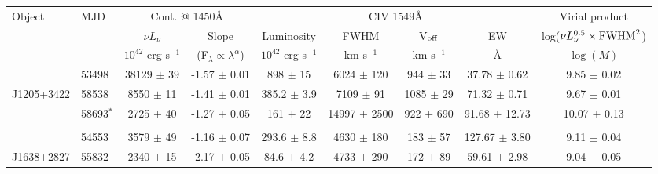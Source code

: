 \documentclass{article}
\begin{document}
\begin{table}
  \scriptsize
  \begin{centering}
    \begin{tabular}{l | l | c c | c c c c | c}
      \hline
      \hline
        Object         &  MJD         &  \multicolumn{2}{c}{Cont. @ 1450\AA }                        &   \multicolumn{4}{c}{CIV 1549\AA}                                                          &  Virial product \\
                       &              &       $\nu L_{\nu}$    &         Slope                       &   Luminosity             &     FWHM           &    V$_{\rm off}$    &          EW          &  log($\nu L_{\nu}^{0.5} \times {\rm FWHM}^2$)\\
                       &              & $10^{42}$ erg s$^{-1}$ & (F$_\lambda \propto \lambda^\alpha$)  & $10^{42}$ erg s$^{-1}$ &     km s$^{-1}$    &    km s$^{-1}$      &          \AA         &  $\log(M)$ \\
      \hline                        
                       &  53498       &  38129   $\pm$ 39      &  -1.57 $\pm$ 0.01                   &  898    $\pm$ 15         &   6024 $\pm$  120  &     944 $\pm$  33   &   37.78 $\pm$  0.62  &   9.85 $\pm$ 0.02\\
          J1205+3422   &  58538       &   8550   $\pm$ 11      &  -1.41 $\pm$ 0.01                   &  385.2  $\pm$  3.9       &   7109 $\pm$   91  &    1085 $\pm$  29   &   71.32 $\pm$  0.71  &   9.67 $\pm$ 0.01\\  
                       &  58693$^*$   &   2725   $\pm$ 40      &  -1.27 $\pm$ 0.05                   &  161    $\pm$ 22         &  14997 $\pm$ 2500  &     922 $\pm$ 690   &   91.68 $\pm$ 12.73  &  10.07 $\pm$ 0.13\\  
                                      &                        &                                     &                          &                    &                     &                      &                  \\
                       &  54553       &   3579   $\pm$ 49      &  -1.16 $\pm$ 0.07                   &  293.6  $\pm$  8.8       &   4630 $\pm$  180  &     183 $\pm$  57   &  127.67 $\pm$  3.80  &   9.11 $\pm$ 0.04\\  
          J1638+2827   &  55832       &   2340   $\pm$ 15      &  -2.17 $\pm$ 0.05                   &   84.6  $\pm$  4.2       &   4733 $\pm$  290  &     172 $\pm$  89   &   59.61 $\pm$  2.98  &   9.04 $\pm$ 0.05\\  

\end{tabular}
\end{centering}
\end{table}
\end{document}
